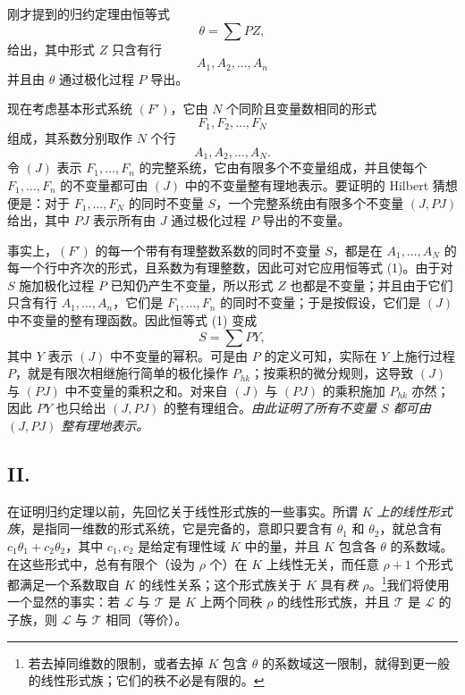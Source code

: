 刚才提到的归约定理由恒等式
\begin{equation}
  \theta=\sum PZ,
\tag{1}
\end{equation}
给出，其中形式 $Z$ 只含有行
\[
  A_1,A_2,\ldots,A_n
\]
并且由 $\theta$ 通过极化过程 $P$ 导出。

现在考虑基本形式系统 $(F')$，它由 $N$ 个同阶且变量数相同的形式
\[
  F_1,F_2,\ldots,F_N
\]
组成，其系数分别取作 $N$ 个行
\[
  A_1,A_2,\ldots,A_N.
\]
令 $(J)$ 表示 $F_1,\ldots,F_n$ 的完整系统，它由有限多个不变量组成，并且使每个 $F_1,\ldots,F_n$ 的不变量都可由 $(J)$ 中的不变量整有理地表示。要证明的 Hilbert 猜想便是：对于 $F_1,\ldots,F_N$ 的同时不变量 $S$，一个完整系统由有限多个不变量 $(J,PJ)$ 给出，其中 $PJ$ 表示所有由 $J$ 通过极化过程 $P$ 导出的不变量。

事实上，$(F')$ 的每一个带有有理整数系数的同时不变量 $S$，都是在 $A_1,\ldots,A_N$ 的每一个行中齐次的形式，且系数为有理整数，因此可对它应用恒等式 (1)。由于对 $S$ 施加极化过程 $P$ 已知仍产生不变量，所以形式 $Z$ 也都是不变量；并且由于它们只含有行 $A_1,\ldots,A_n$，它们是 $F_1,\ldots,F_n$ 的同时不变量；于是按假设，它们是 $(J)$ 中不变量的整有理函数。因此恒等式 (1) 变成
\[
  S=\sum PY,
\]
其中 $Y$ 表示 $(J)$ 中不变量的幂积。可是由 $P$ 的定义可知，实际在 $Y$ 上施行过程 $P$，就是有限次相继施行简单的极化操作 $P_{hk}$；按乘积的微分规则，这导致 $(J)$ 与 $(PJ)$ 中不变量的乘积之和。对来自 $(J)$ 与 $(PJ)$ 的乘积施加 $P_{hk}$ 亦然；因此 $PY$ 也只给出 $(J,PJ)$ 的整有理组合。\emph{由此证明了所有不变量 $S$ 都可由 $(J,PJ)$ 整有理地表示。}

\subsection*{II.}
在证明归约定理以前，先回忆关于线性形式族的一些事实。所谓 \emph{$K$ 上的线性形式族}，是指同一维数的形式系统，它是完备的，意即只要含有 $\theta_1$ 和 $\theta_2$，就总含有 $c_1\theta_1+c_2\theta_2$，其中 $c_1,c_2$ 是给定有理性域 $K$ 中的量，并且 $K$ 包含各 $\theta$ 的系数域。在这些形式中，总有有限个（设为 $\rho$ 个）在 $K$ 上线性无关，而任意 $\rho+1$ 个形式都满足一个系数取自 $K$ 的线性关系；这个形式族关于 $K$ 具有\emph{秩 $\rho$}。\footnote{若去掉同维数的限制，或者去掉 $K$ 包含 $\theta$ 的系数域这一限制，就得到更一般的线性形式族；它们的秩不必是有限的。}我们将使用一个显然的事实：若 $\mathcal L$ 与 $\mathcal T$ 是 $K$ 上两个同秩 $\rho$ 的线性形式族，并且 $\mathcal T$ 是 $\mathcal L$ 的子族，则 $\mathcal L$ 与 $\mathcal T$ 相同（等价）。

